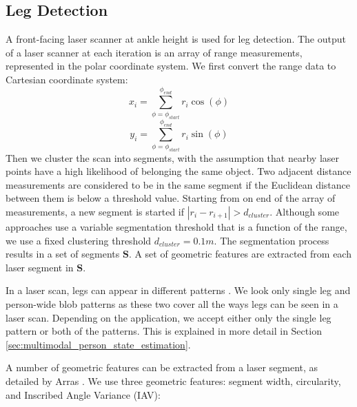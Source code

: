 \subsection{Leg Detection}
\label{sec:multimodal_leg_detection}

A front-facing laser scanner at ankle height is used for leg detection. The output of a laser scanner at each iteration is an array of range measurements, represented in the polar coordinate system. We first convert the range data to Cartesian coordinate system:
\[
x_{i} = \sum_{\phi = \phi_{start}}^{\phi_{end}} r_i\cos(\phi)
\]
\[
y_{i} = \sum_{\phi = \phi_{start}}^{\phi_{end}} r_i\sin(\phi)
\]
Then we cluster the scan into segments, with the assumption that nearby laser points have a high likelihood of belonging the same object. Two adjacent distance measurements are considered to be in the same segment if the Euclidean distance between them is below a threshold value. Starting from on end of the array of measurements, a new segment is started if $|r_{i}-r_{i+1}|>d_{cluster}$. Although some approaches use a variable segmentation threshold that is a function of the range, we use a fixed clustering threshold $d_{cluster}=0.1m$. The segmentation process results in a set of segments $\mathbf{S}$. A set of geometric features are extracted from each laser segment in $\mathbf{S}$.

In a laser scan, legs can appear in different patterns \cite{topp2005tracking}. We look only single leg and person-wide blob patterns as these two cover all the ways legs can be seen in a laser scan. Depending on the application, we accept either only the single leg pattern or both of the patterns. This is explained in more detail in Section \ref{sec:multimodal_person_state_estimation}.

A number of geometric features can be extracted from a laser segment, as detailed by Arras \cite{arras2007using}. We use three geometric features: segment width, circularity, and Inscribed Angle Variance (IAV):


